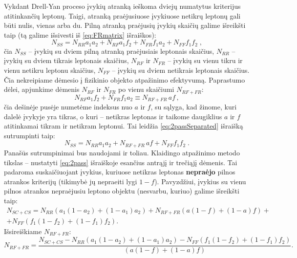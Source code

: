 \documentclass[a4paper, 12pt, oneside]{article}
\newlength\q
\begin{document}
Vykdant Drell-Yan proceso įvykių atranką ieškoma dviejų numatytus kriterijus atitinkančių leptonų.
Taigi, atranką praėjusiuose įvykiuose netikrų leptonų gali būti nulis, vienas arba du.
Pilną atranką praėjusių įvykių skaičių galime išreikšti taip (tą galime išsivesti iš \eqref{eq:FRmatrix} išraiškos):
\begin{equation}
\label{eq:2passSeparated}
	N_{SS} = N_{RR} a_1 a_2 + N_{RF} a_1f_2 + N_{FR} f_1a_2 + N_{FF} f_1 f_2 \; ,
\end{equation}
čia $N_{SS}$ -- įvykių su dviem pilną atranką praėjusiais leptonais skaičius, $N_{RR}$ -- įvykių su dviem
tikrais leptonais skaičius, $N_{RF}$ ir $N_{FR}$ -- įvykių su vienu tikru ir vienu netikru leptonu skaičius,
$N_{FF}$ -- įvykių su dviem netikrais leptonais skaičius.
Čia nekreipiame dėmesio į fizikinio objekto atpažinimo efektyvumą.
Paprastumo dėlei, apjunkime dėmenis $N_{RF}$ ir $N_{FR}$ po vienu skaičiumi $N_{RF+FR}$:
\begin{equation}
	N_{RF} a_1f_2 + N_{FR} f_1a_2 \equiv N_{RF\!+\!FR}\,af \, , 
\end{equation}
čia dešinėje pusėje numetėme indeksus nuo $a$ ir $f$, su sąlyga, kad žinome, kuri dalelė įvykyje yra tikras, o kuri -- netikras
leptonas ir taikome daugiklius $a$ ir $f$ atitinkamai tikram ir netikram leptonui.
Tai leidžia \eqref{eq:2passSeparated} išraišką sutrumpinti taip:
\begin{equation}
\label{eq:2pass}
	N_{SS} = N_{RR} a_1 a_2 + N_{RF\!+\!FR}\, af + N_{FF} f_1 f_2 \; .
\end{equation}
Panašūs sutrumpinimai bus naudojami ir toliau.
Klaidingo atpažinimo metodo tikslas -- nustatyti \eqref{eq:2pass} išraiškoje esančius antrąjį ir trečiąjį dėmenis.
Tai padaroma suskaičiuojant įvykius, kuriuose netikras leptonas \textbf{nepraėjo} pilnos atrankos kriterijų
(tikimybė jų nepraeiti lygi $1\!-\!f$).
Pavyzdžiui, įvykius su vienu pilnos atrankos nepraėjusiu leptono objektu (nesvarbu, kuriuo) galime išreikšti taip:
\begin{equation}
	\label{eq:1fail}
	\begin{gathered}
		N_{SC\!+\!CS} = N_{RR} \left( a_1(1-a_2) + (1-a_1)a_2 \right) + N_{RF\!+\!FR} \left( a(1-f) + (1-a)f \right) + \\
			   + N_{FF} \left( f_1(1-f_2) + (1-f_1)f_2 \right).
	\end{gathered}
\end{equation}
Išsireiškiame $N_{RF\!+\!FR}$:
\begin{equation}
\label{eq:realfake}
	N_{RF\!+\!FR} = \frac{ N_{SC\!+\!CS} - N_{RR} (a_1(1-a_2)+(1-a_1)a_2) - N_{FF} (f_1(1-f_2)+(1-f_1)f_2) }
				   { (a(1-f)+(1-a)f) }.
\end{equation}
\end{document}
